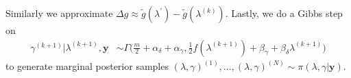 Similarly we approximate $\Delta g \approx \tilde{g}(\lambda^{\prime}) -\tilde{g}(\lambda^{(k)})$.
Lastly, we do a Gibbs step on
\begin{align}
	\gamma^{(k+1)} |  \lambda^{(k+1)}, \bm{y} &\sim \Gamma \bigg( \frac{m}{2} + \alpha_\delta + \alpha_\gamma, \frac{1}{2} f (\lambda^{(k+1)}) + \beta_\gamma + \beta_\delta \lambda^{(k+1)} \bigg)\label{eq:GibbsStep}
\end{align} 
to generate marginal posterior samples $(\lambda, \gamma)^{(1)}, \dots, (\lambda, \gamma)^{(N)} \sim  \pi(\lambda, \gamma| \bm{y})$.
%
